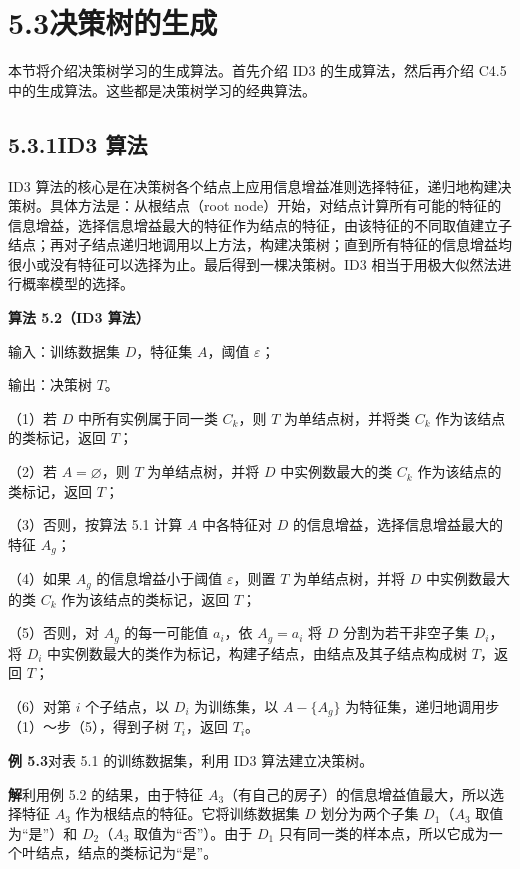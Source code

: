 \documentclass[UTF8, 12pt, fontset=fandol, oneside]{ctexart}
\begin{document}
\section*{5.3\quad 决策树的生成}

本节将介绍决策树学习的生成算法。首先介绍 ID3 的生成算法，然后再介绍 C4.5 中的生成算法。这些都是决策树学习的经典算法。

\subsection*{5.3.1\quad ID3 算法}

ID3 算法的核心是在决策树各个结点上应用信息增益准则选择特征，递归地构建决策树。具体方法是：从根结点（root node）开始，对结点计算所有可能的特征的信息增益，选择信息增益最大的特征作为结点的特征，由该特征的不同取值建立子结点；再对子结点递归地调用以上方法，构建决策树；直到所有特征的信息增益均很小或没有特征可以选择为止。最后得到一棵决策树。ID3 相当于用极大似然法进行概率模型的选择。

\noindent\textbf{算法 5.2（ID3 算法）}

输入：训练数据集 $D$，特征集 $A$，阈值 $\varepsilon$；

输出：决策树 $T$。

（1）若 $D$ 中所有实例属于同一类 $C_k$，则 $T$ 为单结点树，并将类 $C_k$ 作为该结点的类标记，返回 $T$；

（2）若 $A=\varnothing$，则 $T$ 为单结点树，并将 $D$ 中实例数最大的类 $C_k$ 作为该结点的类标记，返回 $T$；

（3）否则，按算法 5.1 计算 $A$ 中各特征对 $D$ 的信息增益，选择信息增益最大的特征 $A_g$；

（4）如果 $A_g$ 的信息增益小于阈值 $\varepsilon$，则置 $T$ 为单结点树，并将 $D$ 中实例数最大的类 $C_k$ 作为该结点的类标记，返回 $T$；

（5）否则，对 $A_g$ 的每一可能值 $a_i$，依 $A_g=a_i$ 将 $D$ 分割为若干非空子集 $D_i$，将 $D_i$ 中实例数最大的类作为标记，构建子结点，由结点及其子结点构成树 $T$，返回 $T$；

（6）对第 $i$ 个子结点，以 $D_i$ 为训练集，以 $A-\{A_g\}$ 为特征集，递归地调用步（1）～步（5），得到子树 $T_i$，返回 $T_i$。

\noindent\textbf{例 5.3}\quad 对表 5.1 的训练数据集，利用 ID3 算法建立决策树。

\noindent\textbf{解}\quad 利用例 5.2 的结果，由于特征 $A_3$（有自己的房子）的信息增益值最大，所以选择特征 $A_3$ 作为根结点的特征。它将训练数据集 $D$ 划分为两个子集 $D_1$（$A_3$ 取值为“是”）和 $D_2$（$A_3$ 取值为“否”）。由于 $D_1$ 只有同一类的样本点，所以它成为一个叶结点，结点的类标记为“是”。
\end{document}

